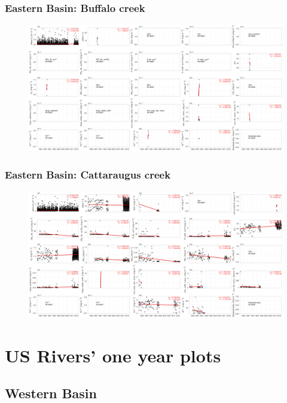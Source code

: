 \documentclass{beamer}
\begin{document}
\begin{frame}
\frametitle{Eastern Basin: Buffalo creek}
\begin{figure}
\includegraphics[width=\textwidth]{rivers/Eastern basin/plot_all Buffalocreek.png}
\end{figure}
\end{frame}

\begin{frame}
\frametitle{Eastern Basin: Cattaraugus creek}
\begin{figure}
\includegraphics[width=\textwidth]{rivers/Eastern basin/plot_all cattarauguscreek.png}
\end{figure}
\end{frame}


\section{US Rivers' one year plots}
\label{sec:us_rivers_one_year_plots}

\subsection{Western Basin}
\label{sub:western_basin}
\end{document}
